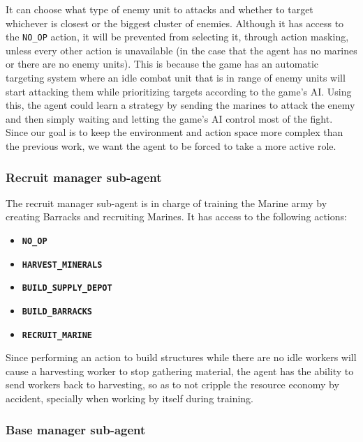 It can choose what type of enemy unit to attacks and whether to target whichever is closest or the biggest cluster of enemies. Although it has access to the \texttt{NO\_OP} action, it will be prevented from selecting it, through action masking, unless every other action is unavailable (in the case that the agent has no marines or there are no enemy units). This is because the game has an automatic targeting system where an idle combat unit that is in range of enemy units will start attacking them while prioritizing targets according to the game's AI. Using this, the agent could learn a  strategy by sending the marines to attack the enemy and then simply waiting and letting the game's AI control most of the fight. Since our goal is to keep the environment and action space more complex than the previous work, we want the agent to be forced to take a more active role.

\subsubsection*{Recruit manager sub-agent}

The recruit manager sub-agent is in charge of training the Marine army by creating Barracks and recruiting Marines. It has access to the following actions:

\begin{multicols}{2}
\begin{itemize}
    \item \textbf{\texttt{NO\_OP}}
    \item \textbf{\texttt{HARVEST\_MINERALS}}
    \item \textbf{\texttt{BUILD\_SUPPLY\_DEPOT}}
    \item \textbf{\texttt{BUILD\_BARRACKS}}
    \item \textbf{\texttt{RECRUIT\_MARINE}}
\end{itemize}
\end{multicols}

Since performing an action to build structures while there are no idle workers will cause a harvesting worker to stop gathering material, the agent has the ability to send workers back to harvesting, so as to not cripple the resource economy by accident, specially when working by itself during training.

\subsubsection*{Base manager sub-agent}

